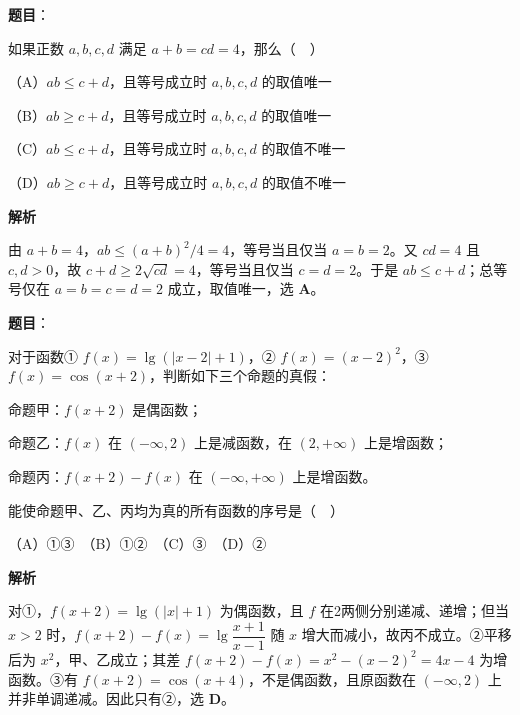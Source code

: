 \begin{answer}

\textbf{题目}：

如果正数 $a,b,c,d$ 满足 $a+b=cd=4$，那么（　）

（A）$ab\leq c+d$，且等号成立时 $a,b,c,d$ 的取值唯一

（B）$ab\geq c+d$，且等号成立时 $a,b,c,d$ 的取值唯一

（C）$ab\leq c+d$，且等号成立时 $a,b,c,d$ 的取值不唯一

（D）$ab\geq c+d$，且等号成立时 $a,b,c,d$ 的取值不唯一

\textbf{解析}

由 $a+b=4$，$ab\le(a+b)^2/4=4$，等号当且仅当 $a=b=2$。又 $cd=4$ 且 $c,d>0$，故 $c+d\ge2\sqrt{cd}=4$，等号当且仅当 $c=d=2$。于是 $ab\le c+d$；总等号仅在 $a=b=c=d=2$ 成立，取值唯一，选 \textbf{A}。


\end{answer}
\begin{answer}

\textbf{题目}：

对于函数① $f(x)=\lg(|x-2|+1)$，② $f(x)=(x-2)^2$，③ $f(x)=\cos(x+2)$，判断如下三个命题的真假：

命题甲：$f(x+2)$ 是偶函数；

命题乙：$f(x)$ 在 $(-\infty,2)$ 上是减函数，在 $(2,+\infty)$ 上是增函数；

命题丙：$f(x+2)-f(x)$ 在 $(-\infty,+\infty)$ 上是增函数。

能使命题甲、乙、丙均为真的所有函数的序号是（　）

（A）①③　（B）①②　（C）③　（D）②

\textbf{解析}

对①，$f(x+2)=\lg(|x|+1)$ 为偶函数，且 $f$ 在2两侧分别递减、递增；但当 $x>2$ 时，$f(x+2)-f(x)=\lg\dfrac{x+1}{x-1}$ 随 $x$ 增大而减小，故丙不成立。②平移后为 $x^2$，甲、乙成立；其差 $f(x+2)-f(x)=x^2-(x-2)^2=4x-4$ 为增函数。③有 $f(x+2)=\cos(x+4)$，不是偶函数，且原函数在 $(-\infty,2)$ 上并非单调递减。因此只有②，选 \textbf{D}。


\end{answer}

